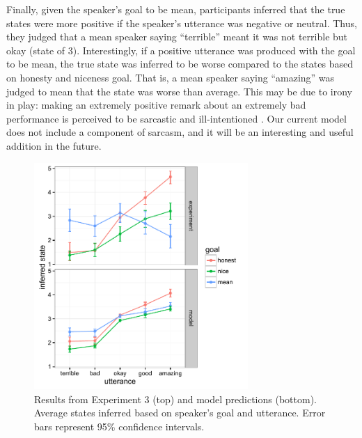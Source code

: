 \documentclass[10pt,letterpaper]{article}
\begin{document}
Finally, given the speaker's goal to be mean, participants inferred that the true states were more positive if the speaker's utterance was negative or neutral. Thus, they judged that a mean speaker saying ``terrible'' meant it was not terrible but okay (state of 3). Interestingly, if a positive utterance was produced with the goal to be mean, the true state was inferred to be worse compared to the states based on honesty and niceness goal. That is, a mean speaker saying ``amazing'' was judged to mean that the state was worse than average. This may be due to irony in play: making an extremely positive remark about an extremely bad performance is perceived to be sarcastic and ill-intentioned \cite{colston1997}. Our current model does not include a component of sarcasm, and it will be an interesting and useful addition in the future.

\begin{figure}
\begin{centering} 
\includegraphics[width=3.2in]{figures/exp3.pdf}
\caption{\label{fig:exp3} Results from Experiment 3 (top) and model predictions (bottom). Average states inferred based on speaker's goal and utterance. Error bars represent 95\% confidence intervals.}
\end{centering} 
\end{figure}



\end{document}
